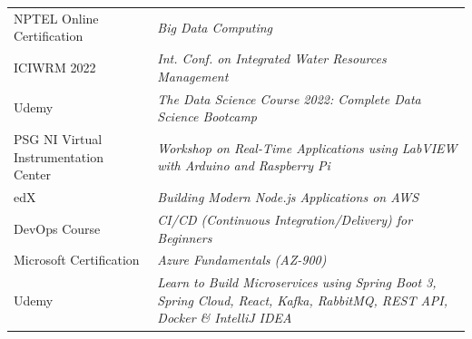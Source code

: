\begin{tabular}{p{} @{\hspace{0.7em}} p{}}
NPTEL Online Certification & \textit{Big Data Computing} \\
ICIWRM 2022 & \textit{Int. Conf. on Integrated Water Resources Management} \\
Udemy & \textit{The Data Science Course 2022: Complete Data Science Bootcamp} \\
PSG NI Virtual Instrumentation Center & \textit{Workshop on Real-Time Applications using LabVIEW with Arduino and Raspberry Pi} \\
edX & \textit{Building Modern Node.js Applications on AWS} \\
DevOps Course & \textit{CI/CD (Continuous Integration/Delivery) for Beginners} \\
Microsoft Certification & \textit{Azure Fundamentals (AZ-900)} \\
Udemy & \textit{Learn to Build Microservices using Spring Boot 3, Spring Cloud, React, Kafka, RabbitMQ, REST API, Docker \& IntelliJ IDEA} \\
\end{tabular}
